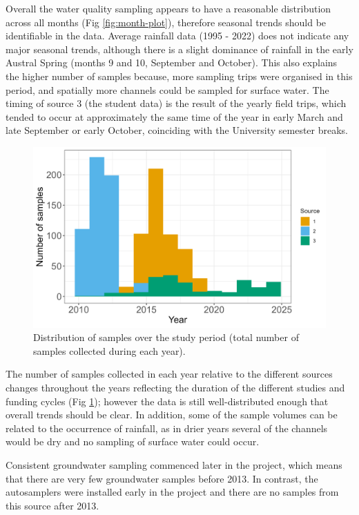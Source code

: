 \documentclass[, manuscript]{copernicus}
\begin{document}
Overall the water quality sampling appears to have a reasonable
distribution across all months (Fig \ref{fig:month-plot}), therefore
seasonal trends should be identifiable in the data. Average rainfall
data (1995 - 2022) does not indicate any major seasonal trends, although
there is a slight dominance of rainfall in the early Austral Spring
(months 9 and 10, September and October). This also explains the higher
number of samples because, more sampling trips were organised in this
period, and spatially more channels could be sampled for surface water.
The timing of source 3 (the student data) is the result of the yearly
field trips, which tended to occur at approximately the same time of the
year in early March and late September or early October, coinciding with
the University semester breaks.

\begin{figure}
\includegraphics[width=0.7\linewidth]{Figures/annual} \caption{Distribution of samples over the study period (total number of samples collected during each year). }\label{fig:annual-plot}
\end{figure}

The number of samples collected in each year relative to the different
sources changes throughout the years reflecting the duration of the
different studies and funding cycles (Fig \ref{fig:annual-plot});
however the data is still well-distributed enough that overall trends
should be clear. In addition, some of the sample volumes can be related
to the occurrence of rainfall, as in drier years several of the channels
would be dry and no sampling of surface water could occur.

Consistent groundwater sampling commenced later in the project, which
means that there are very few groundwater samples before 2013. In
contrast, the autosamplers were installed early in the project and there
are no samples from this source after 2013.
\end{document}
